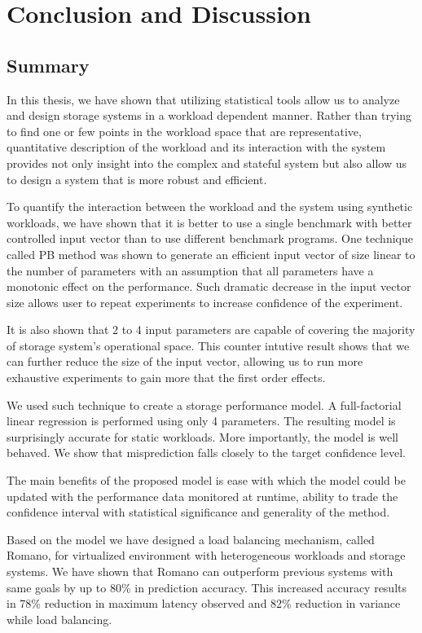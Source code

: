 \chapter{Conclusion and Discussion}
\label{CONCLUSION}

\section{Summary}
In this thesis, we have shown that utilizing statistical tools allow us to analyze and design storage systems in a workload dependent manner. 
Rather than trying to find one or few points in the workload space that are representative, quantitative description of the workload and its interaction with the system provides not only insight into the complex and stateful system but also allow us to design a system that is more robust and efficient. 

To quantify the interaction between the workload and the system using synthetic workloads, we have shown that it is better to use a single benchmark with better controlled input vector than to use different benchmark programs. 
One technique called PB method was shown to generate an efficient input vector of size linear to the number of parameters with an assumption that all parameters have a monotonic effect on the performance.
Such dramatic decrease in the input vector size allows user to repeat experiments to increase confidence of the experiment.

It is also shown that 2 to 4 input parameters are capable of covering the majority of storage system's operational space. 
This counter intutive result shows that we can further reduce the size of the input vector, allowing us to run more exhaustive experiments to gain more that the first order effects. 

We used such technique to create a storage performance model.
A full-factorial linear regression is performed using only 4 parameters.
The resulting model is surprisingly accurate for static workloads.
More importantly, the model is well behaved. 
We show that misprediction falls closely to the target confidence level. 

The main benefits of the proposed model is ease with which the model could be updated with the performance data monitored at runtime, ability to trade the confidence interval with statistical significance and generality of the method. 

Based on the model we have designed a load balancing mechanism, called Romano, for virtualized environment with heterogeneous workloads and storage systems.
We have shown that Romano can outperform previous systems with same goals by up to 80\% in prediction accuracy. This increased accuracy results in 78\% reduction in maximum latency observed and 82\% reduction in variance while load balancing.

